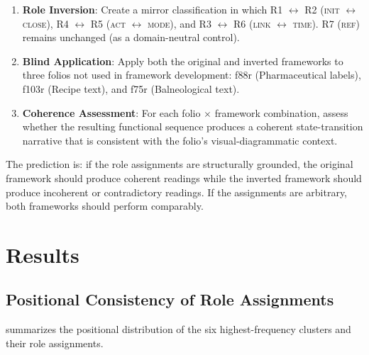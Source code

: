 \documentclass[11pt,a4paper,twocolumn]{article}
\begin{document}
\begin{enumerate}[leftmargin=*,itemsep=2pt]
    \item \textbf{Role Inversion}: Create a mirror classification in which R1 $\leftrightarrow$ R2 (\textsc{init} $\leftrightarrow$ \textsc{close}), R4 $\leftrightarrow$ R5 (\textsc{act} $\leftrightarrow$ \textsc{mode}), and R3 $\leftrightarrow$ R6 (\textsc{link} $\leftrightarrow$ \textsc{time}). R7 (\textsc{ref}) remains unchanged (as a domain-neutral control).
    \item \textbf{Blind Application}: Apply both the original and inverted frameworks to three folios not used in framework development: f88r (Pharmaceutical labels), f103r (Recipe text), and f75r (Balneological text).
    \item \textbf{Coherence Assessment}: For each folio $\times$ framework combination, assess whether the resulting functional sequence produces a coherent state-transition narrative that is consistent with the folio's visual-diagrammatic context.
\end{enumerate}

\noindent The prediction is: if the role assignments are structurally grounded, the original framework should produce coherent readings while the inverted framework should produce incoherent or contradictory readings. If the assignments are arbitrary, both frameworks should perform comparably.

\section{Results}
\label{sec:results}

\subsection{Positional Consistency of Role Assignments}

 summarizes the positional distribution of the six highest-frequency clusters and their role assignments.
\end{document}
